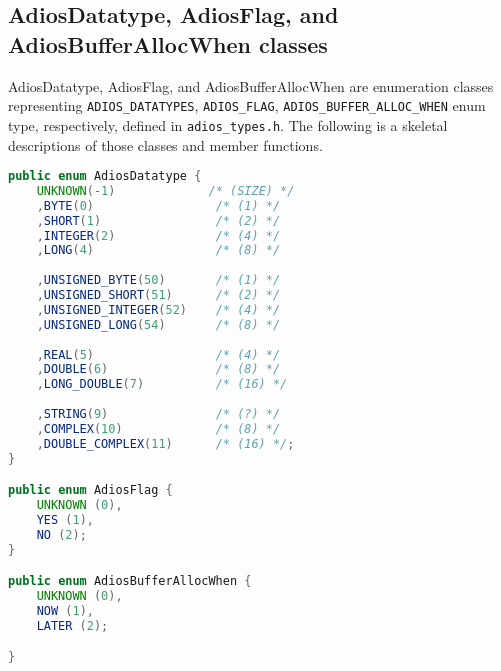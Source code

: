 \subsection{AdiosDatatype, AdiosFlag, and AdiosBufferAllocWhen classes}
AdiosDatatype, AdiosFlag, and AdiosBufferAllocWhen are enumeration classes representing \verb+ADIOS_DATATYPES+, \verb+ADIOS_FLAG+, \verb+ADIOS_BUFFER_ALLOC_WHEN+ enum type, respectively, defined in \verb+adios_types.h+. The following is a skeletal descriptions of those classes and member functions.
\begin{lstlisting}[language=Java,frame=single, backgroundcolor=\color{gray85},caption={Enum classes},label={}]
public enum AdiosDatatype {
    UNKNOWN(-1)             /* (SIZE) */
    ,BYTE(0)                 /* (1) */
    ,SHORT(1)                /* (2) */
    ,INTEGER(2)              /* (4) */
    ,LONG(4)                 /* (8) */
    
    ,UNSIGNED_BYTE(50)       /* (1) */
    ,UNSIGNED_SHORT(51)      /* (2) */
    ,UNSIGNED_INTEGER(52)    /* (4) */
    ,UNSIGNED_LONG(54)       /* (8) */
    
    ,REAL(5)                 /* (4) */
    ,DOUBLE(6)               /* (8) */
    ,LONG_DOUBLE(7)          /* (16) */
    
    ,STRING(9)               /* (?) */
    ,COMPLEX(10)             /* (8) */
    ,DOUBLE_COMPLEX(11)      /* (16) */;
}

public enum AdiosFlag {
    UNKNOWN (0),
    YES (1), 
    NO (2);
}

public enum AdiosBufferAllocWhen {
    UNKNOWN (0),
    NOW (1), 
    LATER (2);

}
\end{lstlisting}


